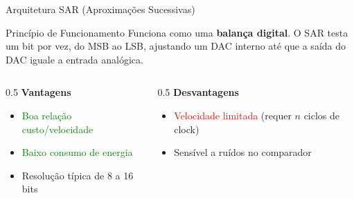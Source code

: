 \documentclass{beamer}
\begin{document}
\begin{frame}{Arquitetura SAR (Aproximações Sucessivas)}
    \begin{block}{Princípio de Funcionamento}
        Funciona como uma \textbf{balança digital}. O SAR testa um bit por vez, do MSB ao LSB, ajustando um DAC interno até que a saída do DAC iguale a entrada analógica.
    \end{block}
    \begin{figure}
        \centering
    \end{figure}
    \begin{columns}[t]
        \begin{column}{0.5\textwidth}
            \textbf{Vantagens}
            \begin{itemize}
                \item \textcolor{green}{Boa relação custo/velocidade}
                \item \textcolor{green}{Baixo consumo de energia}
                \item Resolução típica de 8 a 16 bits
            \end{itemize}
        \end{column}
        \begin{column}{0.5\textwidth}
            \textbf{Desvantagens}
            \begin{itemize}
                \item \textcolor{red}{Velocidade limitada} (requer $n$ ciclos de clock)
                \item Sensível a ruídos no comparador
            \end{itemize}
        \end{column}
    \end{columns}
\end{frame}
\end{document}
